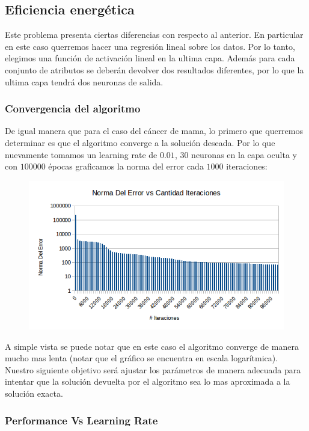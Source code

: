 \subsection{Eficiencia energética} 

Este problema presenta ciertas diferencias con respecto al anterior. En particular en este caso querremos hacer una regresión lineal sobre los datos. Por lo tanto, elegimos una función de activación lineal en la ultima capa. Además para cada conjunto de atributos se deberán devolver dos resultados diferentes, por lo que la ultima capa tendrá dos neuronas de salida.

\subsubsection{Convergencia del algoritmo}

De igual manera que para el caso del cáncer de mama, lo primero que querremos determinar es que el algoritmo converge a la solución deseada. Por lo que nuevamente tomamos un learning rate de $0.01$, $30$ neuronas en la capa oculta y con $100000$ épocas graficamos la norma del error cada $1000$ iteraciones:


\begin{figure}[h!]
  \centering
    \includegraphics[scale=0.4]{ej2/convergencia.png}
\end{figure}

A simple vista se puede notar que en este caso el algoritmo converge de manera mucho mas lenta (notar que el gráfico se encuentra en escala logarítmica). Nuestro siguiente objetivo será ajustar los parámetros de manera adecuada para intentar que la solución devuelta por el algoritmo sea lo mas aproximada a la solución exacta.

\subsubsection{Performance Vs Learning Rate}

